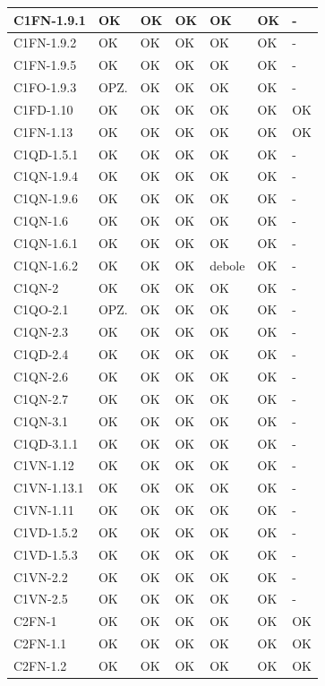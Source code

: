 \begin{footnotesize}
\begin{longtable}{|p{}|p{2cm}|p{2cm}|p{2cm}|p{2cm}|p{}|p{2cm}|}
 C1FN-1.9.1&  OK&  OK&  OK&  OK&  OK& -\\ \hline
 C1FN-1.9.2&  OK&  OK&  OK&  OK&  OK& -\\ \hline
 C1FN-1.9.5&  OK&  OK&  OK&  OK&  OK& -\\ \hline
 C1FO-1.9.3&  OPZ.&  OK&  OK&  OK&  OK& -\\ \hline
 C1FD-1.10&  OK&  OK&  OK&  OK&  OK& OK\\ \hline
 C1FN-1.13&  OK&  OK&  OK&  OK&  OK& OK\\ \hline
 C1QD-1.5.1&  OK&  OK&  OK&  OK&  OK& -\\ \hline
 C1QN-1.9.4&  OK&  OK&  OK&  OK&  OK& -\\ \hline
 C1QN-1.9.6&  OK&  OK&  OK&  OK&  OK& -\\ \hline
 C1QN-1.6&  OK&  OK&  OK&  OK&  OK& -\\ \hline
 C1QN-1.6.1&  OK&  OK&  OK&  OK&  OK& -\\ \hline
 C1QN-1.6.2&  OK&  OK&  OK&  debole&  OK& -\\ \hline
 C1QN-2&  OK&  OK&  OK&  OK&  OK& -\\ \hline
 C1QO-2.1&  OPZ.&  OK&  OK&  OK&  OK& -\\ \hline
 C1QN-2.3&  OK&  OK&  OK&  OK&  OK& -\\ \hline
 C1QD-2.4&  OK&  OK&  OK&  OK&  OK& -\\ \hline
 C1QN-2.6&  OK&  OK&  OK&  OK&  OK& -\\ \hline
 C1QN-2.7&  OK&  OK&  OK&  OK&  OK& -\\ \hline
 C1QN-3.1&  OK&  OK&  OK&  OK&  OK& -\\ \hline
 C1QD-3.1.1&  OK&  OK&  OK&  OK&  OK& -\\ \hline
 C1VN-1.12&  OK&  OK&  OK&  OK&  OK& -\\ \hline
 C1VN-1.13.1&  OK&  OK&  OK&  OK&  OK& -\\ \hline
 C1VN-1.11&  OK&  OK&  OK&  OK&  OK& -\\ \hline
 C1VD-1.5.2&  OK&  OK&  OK&  OK&  OK& -\\ \hline
 C1VD-1.5.3&  OK&  OK&  OK&  OK&  OK& -\\ \hline
 C1VN-2.2&  OK&  OK&  OK&  OK&  OK& -\\ \hline
 C1VN-2.5&  OK&  OK&  OK&  OK&  OK& -\\ \hline
 C2FN-1&  OK&  OK&  OK&  OK&  OK& OK\\ \hline
 C2FN-1.1&  OK&  OK&  OK&  OK&  OK& OK\\ \hline
 C2FN-1.2&  OK&  OK&  OK&  OK&  OK& OK\\ \hline

\end{longtable}
\end{footnotesize}
